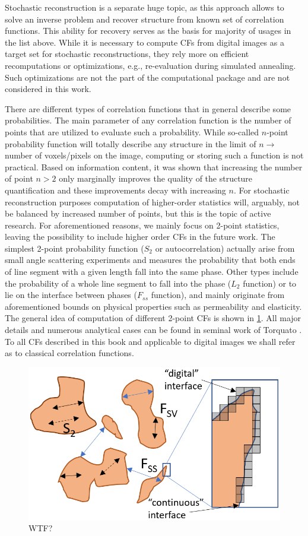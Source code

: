\documentclass[reprint,amsmath,amssymb,aps,pre]{revtex4-1}
\begin{document}
Stochastic reconstruction is a separate huge topic, as this approach allows to
solve an inverse problem and recover structure from known set of correlation
functions. This ability for recovery serves as the basis for majority of usages
in the list above. While it is necessary to compute CFs from digital images as a
target set for stochastic reconstructions, they rely more on efficient
recomputations or optimizations, e.g., re-evaluation during simulated
annealing. Such optimizations are not the part of the computational package and
are not considered in this work.

There are different types of correlation functions that in general describe some
probabilities. The main parameter of any correlation function is the number of
points that are utilized to evaluate such a probability. While so-called
$n$-point probability function\cite{Torq_book} will totally describe any
structure in the limit of $n \rightarrow$ number of voxels/pixels on the image,
computing or storing such a function is not practical. Based on information
content, it was shown that increasing the number of point $n > 2$ only
marginally improves the quality of the structure quantification and these
improvements decay with increasing $n$. For stochastic reconstruction purposes
computation of higher-order statistics will, arguably, not be balanced by
increased number of points, but this is the topic of active research. For
aforementioned reasons, we mainly focus on 2-point statistics, leaving the
possibility to include higher order CFs in the future work. The simplest 2-point
probability function ($S_2$ or autocorrelation) actually arise from small angle
scattering experiments and measures the probability that both ends of line
segment with a given length fall into the same phase. Other types include the
probability of a whole line segment to fall into the phase ($L_2$ function) or
to lie on the interface between phases ($F_{ss}$ function), and mainly originate
from aforementioned bounds on physical properties such as permeability and
elasticity. The general idea of computation of different 2-point CFs is shown in
\cref{fig:functions}. All major details and numerous analytical cases can be
found in seminal work of Torquato \cite{Torq_book}. To all CFs described in this
book and applicable to digital images we shall refer as to classical correlation
functions.

\begin{figure}[ht]
  \centering
  \includegraphics[width=.3\textwidth]{images/corr.png}
  \caption[]{{\small WTF?}}
  \label{fig:functions}
\end{figure}
\end{document}

